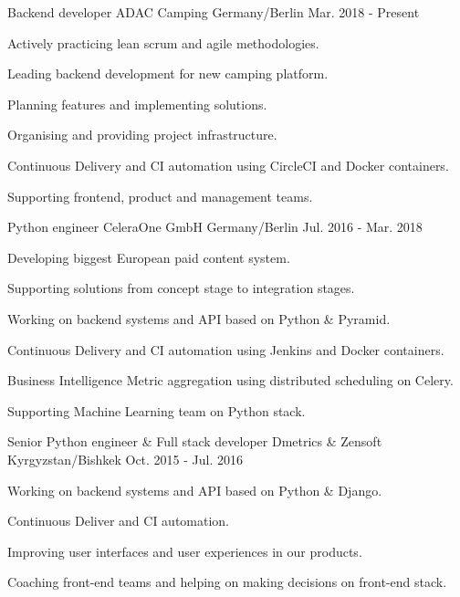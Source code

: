 \begin{cventries}
  \cventry
    {Backend developer}
    {ADAC Camping}
    {Germany/Berlin}
    {Mar. 2018 - Present}
    {
      \begin{cvitems}
        \item {Actively practicing lean scrum and agile methodologies.}
        \item {Leading backend development for new camping platform.}
        \item {Planning features and implementing solutions.}
        \item {Organising and providing project infrastructure.}
        \item {Continuous Delivery and CI automation using CircleCI and Docker containers.}
        \item {Supporting frontend, product and management teams.}
      \end{cvitems}
    }
  \cventry
    {Python engineer}
    {CeleraOne GmbH}
    {Germany/Berlin}
    {Jul. 2016 - Mar. 2018}
    {
      \begin{cvitems}
        \item {Developing biggest European paid content system.}
        \item {Supporting solutions from concept stage to integration stages.}
        \item {Working on backend systems and API based on Python \& Pyramid.}
        \item {Continuous Delivery and CI automation using Jenkins and Docker containers.}
        \item {Business Intelligence Metric aggregation using distributed scheduling on Celery.}
        \item {Supporting Machine Learning team on Python stack.}
      \end{cvitems}
    }
  \cventry
    {Senior Python engineer \& Full stack developer}
    {Dmetrics \& Zensoft}
    {Kyrgyzstan/Bishkek}
    {Oct. 2015 - Jul. 2016}
    {
      \begin{cvitems}
        \item {Working on backend systems and API based on Python \& Django.}
        \item {Continuous Deliver and CI automation.}
        \item {Improving user interfaces and user experiences in our products.}
        \item {Coaching front-end teams and helping on making decisions on front-end stack.}

\end{cvitems}}
\end{cventries}
